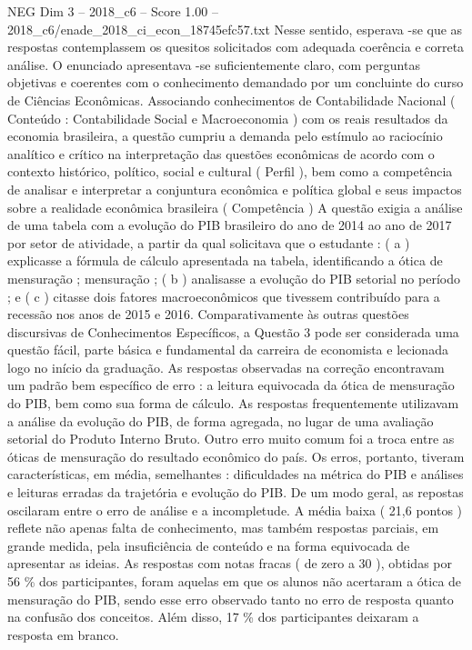 \begin{textsample}{NEG Dim 3 – 2018\_c6 – Score 1.00 – 2018\_c6/enade\_2018\_ci\_econ\_18745efc57.txt}
Nesse sentido, esperava -se que as respostas contemplassem os quesitos solicitados com adequada coerência e correta análise.
O enunciado apresentava -se suficientemente claro, com perguntas objetivas e coerentes com o conhecimento demandado por um concluinte do curso de Ciências Econômicas.
Associando conhecimentos de Contabilidade Nacional ( Conteúdo : Contabilidade Social e Macroeconomia ) com os reais resultados da economia brasileira, a questão cumpriu a demanda pelo estímulo ao raciocínio analítico e crítico na interpretação das questões econômicas de acordo com o contexto histórico, político, social e cultural ( Perfil ), bem como a competência de analisar e interpretar a conjuntura econômica e política global e seus impactos sobre a realidade econômica brasileira ( Competência ) A questão exigia a análise de uma tabela com a evolução do PIB brasileiro do ano de 2014 ao ano de 2017 por setor de atividade, a partir da qual solicitava que o estudante : ( a ) explicasse a fórmula de cálculo apresentada na tabela, identificando a ótica de mensuração ; mensuração ; ( b ) analisasse a evolução do PIB setorial no período ; e ( c ) citasse dois fatores macroeconômicos que tivessem contribuído para a recessão nos anos de 2015 e 2016.
Comparativamente às outras questões discursivas de Conhecimentos Específicos, a Questão 3 pode ser considerada uma questão fácil, parte básica e fundamental da carreira de economista e lecionada logo no início da graduação.
As respostas observadas na correção encontravam um padrão bem específico de erro : a leitura equivocada da ótica de mensuração do PIB, bem como sua forma de cálculo.
As respostas frequentemente utilizavam a análise da evolução do PIB, de forma agregada, no lugar de uma avaliação setorial do Produto Interno Bruto.
Outro erro muito comum foi a troca entre as óticas de mensuração do resultado econômico do país.
Os erros, portanto, tiveram características, em média, semelhantes : dificuldades na métrica do PIB e análises e leituras erradas da trajetória e evolução do PIB.
De um modo geral, as repostas oscilaram entre o erro de análise e a incompletude.
A média baixa ( 21,6 pontos ) reflete não apenas falta de conhecimento, mas também respostas parciais, em grande medida, pela insuficiência de conteúdo e na forma equivocada de apresentar as ideias.
As respostas com notas fracas ( de zero a 30 ), obtidas por 56 \% dos participantes, foram aquelas em que os alunos não acertaram a ótica de mensuração do PIB, sendo esse erro observado tanto no erro de resposta quanto na confusão dos conceitos.
Além disso, 17 \% dos participantes deixaram a resposta em branco.

\end{textsample}
